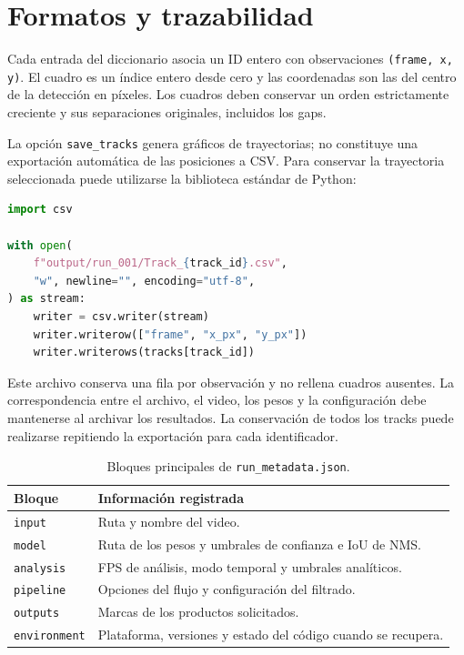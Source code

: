 \section{Formatos y trazabilidad}

Cada entrada del diccionario asocia un ID entero con observaciones \verb|(frame, x, y)|. El cuadro es un índice entero desde cero y las coordenadas son las del centro de la detección en píxeles. Los cuadros deben conservar un orden estrictamente creciente y sus separaciones originales, incluidos los gaps.

La opción \verb|save_tracks| genera gráficos de trayectorias; no constituye una exportación automática de las posiciones a CSV. Para conservar la trayectoria seleccionada puede utilizarse la biblioteca estándar de Python:

\noindent\begin{minipage}{\linewidth}
\begin{lstlisting}[style=thesiscode,language=Python]
import csv

with open(
    f"output/run_001/Track_{track_id}.csv",
    "w", newline="", encoding="utf-8",
) as stream:
    writer = csv.writer(stream)
    writer.writerow(["frame", "x_px", "y_px"])
    writer.writerows(tracks[track_id])
\end{lstlisting}
\end{minipage}\par

Este archivo conserva una fila por observación y no rellena cuadros ausentes. La correspondencia entre el archivo, el video, los pesos y la configuración debe mantenerse al archivar los resultados. La conservación de todos los tracks puede realizarse repitiendo la exportación para cada identificador.

\begin{table}[htbp]
  \centering
  \small
  \caption{Bloques principales de \texttt{run\_metadata.json}.}
  \label{tab:apendice-metadatos}
  \begin{tabularx}{\textwidth}{@{}l X@{}}
    \toprule
    Bloque & Información registrada \\
    \midrule
    \texttt{input} & Ruta y nombre del video. \\
    \texttt{model} & Ruta de los pesos y umbrales de confianza e IoU de NMS. \\
    \texttt{analysis} & FPS de análisis, modo temporal y umbrales analíticos. \\
    \texttt{pipeline} & Opciones del flujo y configuración del filtrado. \\
    \texttt{outputs} & Marcas de los productos solicitados. \\
    \texttt{environment} & Plataforma, versiones y estado del código cuando se recupera. \\
    \bottomrule
  \end{tabularx}
\end{table}

